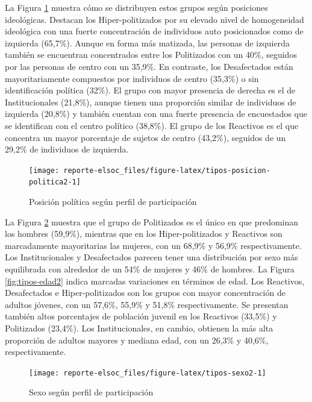 \documentclass[
  12pt,
]{book}
\begin{document}
La Figura \ref{fig:tipos-posicion-politica2} muestra cómo se distribuyen estos grupos según posiciones ideológicas. Destacan los Hiper-politizados por su elevado nivel de homogeneidad ideológica con una fuerte concentración de individuos auto posicionados como de izquierda (65,7\%). Aunque en forma más matizada, las personas de izquierda también se encuentran concentrados entre los Politizados con un 40\%, seguidos por las personas de centro con un 35,9\%. En contraste, los Desafectados están mayoritariamente compuestos por individuos de centro (35,3\%) o sin identificación política (32\%). El grupo con mayor presencia de derecha es el de Institucionales (21,8\%), aunque tienen una proporción similar de individuos de izquierda (20,8\%) y también cuentan con una fuerte presencia de encuestados que se identifican con el centro político (38,8\%). El grupo de los Reactivos es el que concentra un mayor porcentaje de sujetos de centro (43,2\%), seguidos de un 29,2\% de individuos de izquierda.

\begin{figure}

{\centering \texttt{[image: reporte-elsoc\_files/figure-latex/tipos-posicion-politica2-1]} 

}

\caption{Posición política según perfil de participación}\label{fig:tipos-posicion-politica2}
\end{figure}

La Figura \ref{fig:tipos-sexo2} muestra que el grupo de Politizados es el único en que predominan los hombres (59,9\%), mientras que en los Hiper-politizados y Reactivos son marcadamente mayoritarias las mujeres, con un 68,9\% y 56,9\% respectivamente. Los Institucionales y Desafectados parecen tener una distribución por sexo más equilibrada con alrededor de un 54\% de mujeres y 46\% de hombres. La Figura \ref{fig:tipos-edad2} indica marcadas variaciones en términos de edad. Los Reactivos, Desafectados e Hiper-politizados son los grupos con mayor concentración de adultos jóvenes, con un 57,6\%, 55,9\% y 51,8\% respectivamente. Se presentan también altos porcentajes de población juvenil en los Reactivos (33,5\%) y Politizados (23,4\%). Los Institucionales, en cambio, obtienen la más alta proporción de adultos mayores y mediana edad, con un 26,3\% y 40,6\%, respectivamente.

\begin{figure}

{\centering \texttt{[image: reporte-elsoc\_files/figure-latex/tipos-sexo2-1]} 

}

\caption{Sexo según perfil de participación}\label{fig:tipos-sexo2}
\end{figure}
\end{document}
